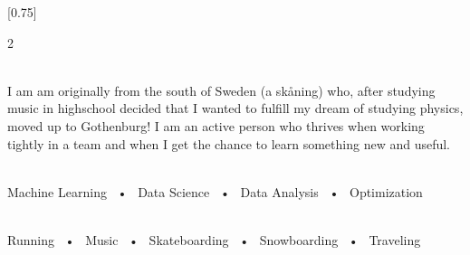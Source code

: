 \documentclass[lighthipster]{simplehipstercv}
\begin{document}
\setlength{\columnsep}{1.5cm}
[0.75]
\begin{paracol}{2}

\paracolbackgroundoptions



\footnotesize
{\setasidefontcolour
\flushright
\begin{center}
\end{center}

\\[0.5em]

{\footnotesize
I am am originally from the south of Sweden (a skåning) who, after studying
music in highschool decided that I wanted to fulfill my dream of studying physics,
moved up to Gothenburg! I am an active person who thrives when working tightly
in a team and when I get the chance to learn something new and useful.}
\bigskip





 \\[0.5em]

Machine Learning ~•~ Data Science ~•~ Data Analysis ~•~ Optimization




\bigskip

\\[0.5em]

Running ~•~ Music ~•~ Skateboarding ~•~ Snowboarding ~•~ Traveling






\vspace{2em}

}
\end{paracol}
\end{document}
